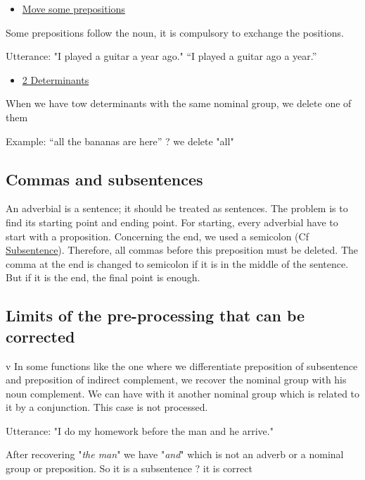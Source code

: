 \documentclass[twoside,a4paper,10pt]{report}
\begin{document}
\begin{itemize}
    \item  \underline{Move some prepositions}
\end{itemize}
Some prepositions follow the noun, it is compulsory to exchange the positions.


\small
\begin{verbatimtab}
  Utterance: "I played a guitar a year ago."
  “I played a guitar ago a year.”
\end{verbatimtab}
\normalsize

\begin{itemize}
    \item  \underline{2 Determinants}
\end{itemize}
When we have tow determinants with the same nominal group, we delete one of them


\small
\begin{verbatimtab}
  Example: “all the bananas are here” ? we delete "all"
\end{verbatimtab}
\normalsize

\subsection{Commas and subsentences}
\label{f50e61d6a41031b0a4d3b4c2287c8dfa}%
An adverbial is a sentence; it should be treated as sentences. The problem is to find its starting point and ending point. For starting, every adverbial have to start with a proposition. Concerning the end, we used a semicolon (Cf \hyperref[60550ca08c44dda94b3d7a018a352868]{Subsentence}). Therefore, all commas before this preposition must be deleted. The comma at the end is changed to semicolon if it is in the middle of the sentence. But if it is the end, the final point is enough.


\subsection{Limits of the pre-processing that can be corrected}
\label{751e28b2f79ada5fd6de3cc8dcb5ed90}%
v  In some functions like the one where we differentiate preposition of subsentence and preposition of indirect complement, we recover the nominal group with his noun complement. We can have with it another nominal group which is related to it by a conjunction. This case is not processed.


\small
\begin{verbatimtab}
  Utterance: "I do my homework before the man and he arrive."
\end{verbatimtab}
\normalsize
After recovering "\textsl{the man}" we have "\textsl{and}" which is not an adverb or a nominal group or preposition. So it is a subsentence ? it is correct
\end{document}
